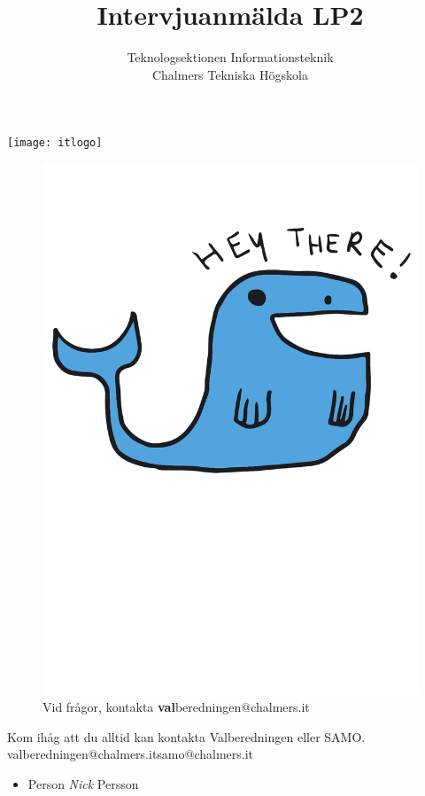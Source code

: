 \documentclass[11pt, noincludeaddress, nopagination]{classes/cthit}
\begin{document}
\thispagestyle{empty}

\title{Intervjuanmälda LP2 \the\year}
\subtitle{ \large Teknologsektionen Informationsteknik \\ Chalmers Tekniska Högskola}

\begin{center}
\texttt{[image: itlogo]}
\end{center}

\makeheadfoot%

\makesimpletitle
\vspace{1cm}

\newpage
\thispagestyle{empty}

\begin{figure}[h]
    \centering
    \includegraphics[width=\textwidth, angle=2]{whale}
    Vid frågor, kontakta \textbf{val}beredningen@chalmers.it
\end{figure}

\clearpage

\begin{center}
    Kom ihåg att du alltid kan kontakta Valberedningen eller SAMO.\\
    valberedningen@chalmers.it\hspace{25pt}samo@chalmers.it
\end{center}

\begin{itemize}
   \item Person \textit{Nick} Persson
   
\end{itemize}
\end{document}
